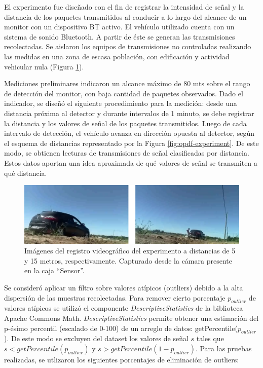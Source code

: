 El experimento fue diseñado con el fin de registrar la intensidad de señal y la distancia de los paquetes transmitidos al conducir a lo largo del alcance de un monitor con un dispositivo BT activo. El vehículo utilizado cuenta con un sistema de sonido Bluetooth. A partir de éste se generan las transmisiones recolectadas. Se aislaron los equipos de transmisiones no controladas realizando las medidas en una zona de escasa población, con edificación y actividad vehicular nula (Figura \ref{fig:pruebas-empiricas}).

Mediciones preliminares indicaron un alcance máximo de 80 mts sobre el rango de detección del monitor, con baja cantidad de paquetes observados. Dado el indicador, se diseñó el siguiente procedimiento para la medición: desde una distancia próxima al detector y durante intervalos de 1 minuto, se debe registrar la distancia y los valores de señal de los paquetes transmitidos. Luego de cada intervalo de detección, el vehículo avanza en dirección opuesta al detector, según el esquema de distancias representado por la Figura \ref{fig:opdf-experiment}. De este modo, se obtienen lecturas de transmisiones de señal clasificadas por distancia. Estos datos aportan una idea aproximada de qué valores de señal se transmiten a qué distancia.

\begin{figure}[!htp]
	\centering
	\includegraphics[width=\textwidth]{images/pruebas-empiricas.png}
	\caption{Imágenes del registro videográfico del experimento a distancias de 5 y 15 metros, respectivamente. Capturado desde la cámara presente en la caja ``Sensor''.}
    \label{fig:pruebas-empiricas}
\end{figure}

Se consideró aplicar un filtro sobre valores atípicos (outliers) debido a la alta dispersión de las muestras recolectadas. Para remover cierto porcentaje $p_{outlier}$ de valores atípicos se utilizó el componente \textit{DescriptiveStatistics} de la biblioteca Apache Commons Math. \textit{DescriptiveStatistics} permite obtener una estimación del p-ésimo percentil (escalado de 0-100) de un arreglo de datos: getPercentile($p_{outlier}$). De este modo se excluyen del dataset los valores de señal $s$ tales que $s < getPercentile(p_{outlier})$ y $s > getPercentile(1-p_{outlier})$. Para las pruebas realizadas, se utlizaron los siguientes porcentajes de eliminación de outliers:

